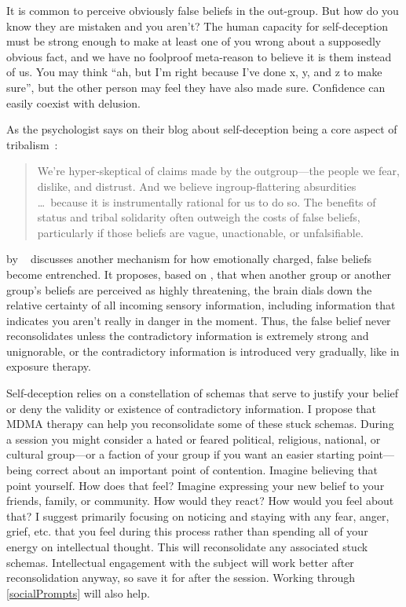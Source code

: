 \documentclass[11pt,oneside]{book}
\let\cite\parencite
\newcommand{\prosecite}[1]{\citetitle{#1} by \citefullauthor{#1}~\cite{#1}}
\begin{document}
It is common to perceive obviously false beliefs in the out-group. But how do you know they are mistaken and you aren't? The human capacity for self-deception must be strong enough to make at least one of you wrong about a supposedly obvious fact, and we have no foolproof meta-reason to believe it is them instead of us. You may think \enquote{ah, but I'm right because I've done x, y, and z to make sure}, but the other person may feel they have also made sure. Confidence can easily coexist with delusion.

As the psychologist  says on their blog about self-deception being a core aspect of tribalism~\cite{pinsof2024Truth}:
\begin{quotation}
	We're hyper-skeptical of claims made by the outgroup---the people we fear, dislike, and distrust. And we believe ingroup-flattering absurdities \dots\ because it is instrumentally rational for us to do so. The benefits of status and tribal solidarity often outweigh the costs of false beliefs, particularly if those beliefs are vague, unactionable, or unfalsifiable.
\end{quotation}

\prosecite{alexanderTrapped} discusses another mechanism for how emotionally charged, false beliefs become entrenched. It proposes, based on \textcite{berghBSTS}, that when another group or another group's beliefs are perceived as highly threatening, the brain dials down the relative certainty of all incoming sensory information, including information that indicates you aren't really in danger in the moment. Thus, the false belief never reconsolidates unless the contradictory information is extremely strong and unignorable, or the contradictory information is introduced very gradually, like in exposure therapy.

Self-deception relies on a constellation of schemas that serve to justify your belief or deny the validity or existence of contradictory information. I propose that MDMA therapy can help you reconsolidate some of these stuck schemas. During a session you might consider a hated or feared political, religious, national, or cultural group---or a faction of your group if you want an easier starting point---being correct about an important point of contention. Imagine believing that point yourself. How does that feel? Imagine expressing your new belief to your friends, family, or community. How would they react? How would you feel about that? I suggest primarily focusing on noticing and staying with any fear, anger, grief, etc. that you feel during this process rather than spending all of your energy on intellectual thought. This will reconsolidate any associated stuck schemas. Intellectual engagement with the subject will work better after reconsolidation anyway, so save it for after the session. Working through \cref{socialPrompts} will also help.
\end{document}
